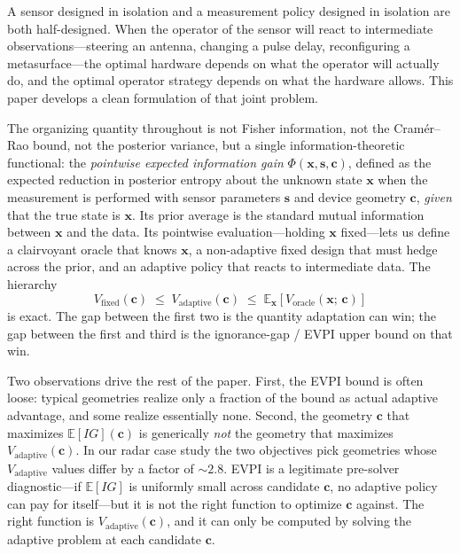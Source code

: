 \documentclass[11pt,a4paper]{article}
\newcommand{\E}{\mathbb{E}}
\begin{document}
A sensor designed in isolation and a measurement policy designed in isolation are both half-designed.  When the operator of the sensor will react to intermediate observations---steering an antenna, changing a pulse delay, reconfiguring a metasurface---the optimal hardware depends on what the operator will actually do, and the optimal operator strategy depends on what the hardware allows.  This paper develops a clean formulation of that joint problem.

The organizing quantity throughout is not Fisher information, not the Cram\'er--Rao bound, not the posterior variance, but a single information-theoretic functional: the \emph{pointwise expected information gain} $\Phi(\bm{x}, \bm{s}, \bm{c})$, defined as the expected reduction in posterior entropy about the unknown state $\bm{x}$ when the measurement is performed with sensor parameters $\bm{s}$ and device geometry $\bm{c}$, \emph{given} that the true state is $\bm{x}$.  Its prior average is the standard mutual information between $\bm{x}$ and the data.  Its pointwise evaluation---holding $\bm{x}$ fixed---lets us define a clairvoyant oracle that knows $\bm{x}$, a non-adaptive fixed design that must hedge across the prior, and an adaptive policy that reacts to intermediate data.  The hierarchy
\[
  V_{\mathrm{fixed}}(\bm{c}) \;\le\; V_{\mathrm{adaptive}}(\bm{c}) \;\le\; \E_{\bm{x}}[V_{\mathrm{oracle}}(\bm{x};\,\bm{c})]
\]
is exact.  The gap between the first two is the quantity adaptation can win; the gap between the first and third is the ignorance-gap / EVPI upper bound on that win.

Two observations drive the rest of the paper.  First, the EVPI bound is often loose: typical geometries realize only a fraction of the bound as actual adaptive advantage, and some realize essentially none.  Second, the geometry $\bm{c}$ that maximizes $\E[IG](\bm{c})$ is generically \emph{not} the geometry that maximizes $V_{\mathrm{adaptive}}(\bm{c})$.  In our radar case study the two objectives pick geometries whose $V_{\mathrm{adaptive}}$ values differ by a factor of $\sim\!2.8$.  EVPI is a legitimate pre-solver diagnostic---if $\E[IG]$ is uniformly small across candidate $\bm{c}$, no adaptive policy can pay for itself---but it is not the right function to optimize $\bm{c}$ against.  The right function is $V_{\mathrm{adaptive}}(\bm{c})$, and it can only be computed by solving the adaptive problem at each candidate $\bm{c}$.
\end{document}
